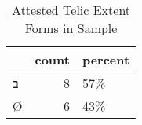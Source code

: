 \begin{table}[htbp!]
\centering
\caption{Attested Telic Extent Forms in Sample}
\label{table:telic_front}
\begin{tabular}{lrl}
\toprule
{} &  count & percent \\
\midrule
\texthebrew{ב} &      8 &     57\% \\
\texthebrew{Ø} &      6 &     43\% \\
\bottomrule
\end{tabular}
\end{table}
